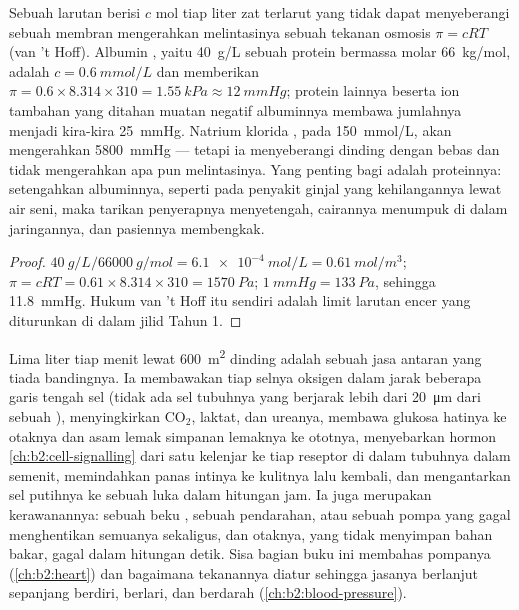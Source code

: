 \begin{theorem}\label{thm:b2:blood-circulation:oncotic}
Sebuah larutan berisi $c$ mol tiap liter zat terlarut yang tidak dapat
menyeberangi sebuah membran mengerahkan melintasinya sebuah tekanan
osmosis $\pi = cRT$ (van 't Hoff). Albumin , yaitu \qty{40}{g/L}
sebuah protein bermassa molar \qty{66}{kg/mol}, adalah $c = \qty{0.6}{mmol/L}$ dan memberikan $\pi =
0.6\times 8.314\times 310 = \qty{1.55}{kPa} \approx \qty{12}{mmHg}$; protein lainnya beserta ion
tambahan yang ditahan muatan negatif albuminnya membawa jumlahnya
menjadi kira-kira \qty{25}{mmHg}. Natrium klorida , pada
\qty{150}{mmol/L}, akan mengerahkan \qty{5800}{mmHg} --- tetapi ia
menyeberangi dinding  dengan bebas dan tidak mengerahkan apa
pun melintasinya. Yang penting bagi  adalah proteinnya:
setengahkan albuminnya, seperti pada penyakit ginjal yang
kehilangannya lewat air seni, maka tarikan penyerapnya menyetengah,
cairannya menumpuk di dalam jaringannya, dan pasiennya membengkak.
\end{theorem}
\begin{proof}
$\qty{40}{g/L}/\qty{66000}{g/mol} = \qty{6.1e-4}{mol/L} =
\qty{0.61}{mol/m^3}$; $\pi = cRT = 0.61\times 8.314\times 310 =
\qty{1570}{Pa}$; $\qty{1}{mmHg} = \qty{133}{Pa}$, sehingga \qty{11.8}{mmHg}.
Hukum van 't Hoff itu sendiri adalah limit larutan encer yang
diturunkan di dalam jilid Tahun 1.
\end{proof}

\begin{example}\label{ex:b2:blood-circulation:transport}
Lima liter tiap menit lewat \qty{600}{m^2} dinding  adalah
sebuah jasa antaran yang tiada bandingnya. Ia membawakan tiap selnya
oksigen dalam jarak beberapa garis tengah sel (tidak ada sel tubuhnya
yang berjarak lebih dari \qty{20}{\micro m} dari sebuah ),
menyingkirkan $\mathrm{CO_2}$, laktat, dan ureanya, membawa glukosa
hatinya ke otaknya dan asam lemak simpanan lemaknya ke ototnya,
menyebarkan hormon \cref{ch:b2:cell-signalling} dari satu kelenjar ke
tiap reseptor di dalam tubuhnya dalam semenit, memindahkan panas
intinya ke kulitnya lalu kembali, dan mengantarkan sel  putihnya
ke sebuah luka dalam hitungan jam. Ia juga merupakan kerawanannya:
sebuah beku , sebuah pendarahan, atau sebuah pompa yang gagal
menghentikan semuanya sekaligus, dan otaknya, yang tidak menyimpan
bahan bakar, gagal dalam hitungan detik. Sisa bagian buku ini membahas
pompanya (\cref{ch:b2:heart}) dan bagaimana tekanannya diatur sehingga
jasanya berlanjut sepanjang berdiri, berlari, dan berdarah
(\cref{ch:b2:blood-pressure}).
\end{example}

